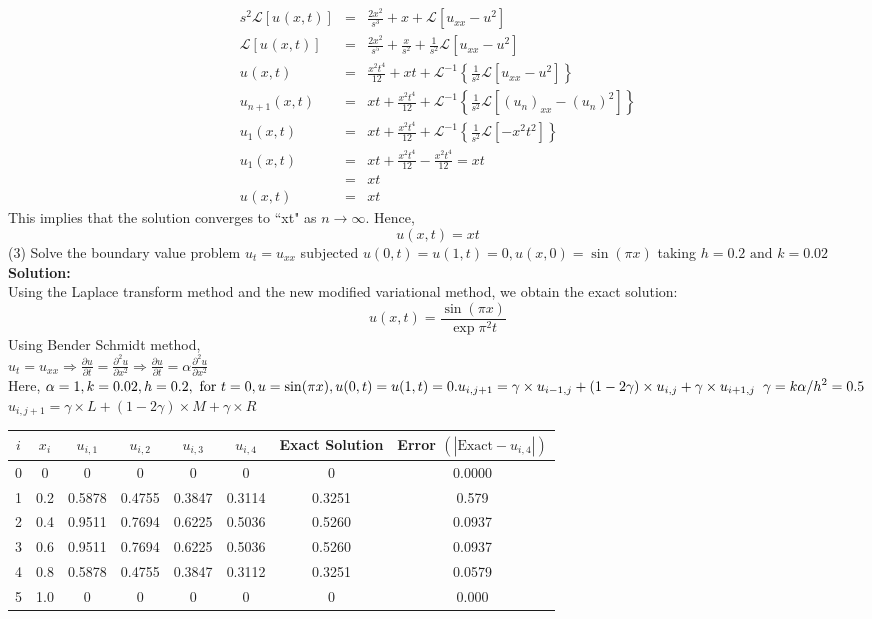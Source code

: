 \documentclass[12pt]{report}
\newcommand{\Laplace}{\mathcal{L}}
\newcommand{\Un}[2]{u_{#1}(#2)}
\newcommand{\LT}[1]{\Laplace \left[#1\right]}
\newcommand{\Unx}[1]{\Un{#1}{x,t}}
\newcommand{\InverseLx}[1]{\Laplace^{-1}\left\{ #1 \right\}}
\newcommand{\Usub}[1]{u_{#1}}
\newcommand{\Usup}[1]{u^{#1}}
\begin{document}
\begin{eqnarray*}
s^2 \LT{\Un{}{x,t}} &=& \frac{2x^2}{s^3} + x + \LT{\Usub{xx} - \Usup{2}} \\
\LT{\Un{}{x,t}} &=& \frac{2x^2}{s^5} + \frac{x}{s^2} + \frac{1}{s^2}\LT{\Usub{xx} - \Usup{2}} \\
\Un{}{x,t} &=& \frac{x^2t^4}{12} + xt + \InverseLx{\frac{1}{s^2}\LT{\Usub{xx} - \Usup{2}}} \\
\Unx{n+1} &=& xt + \frac{x^2t^4}{12} + \InverseLx{\frac{1}{s^2}\LT{(\Usub{n})_{xx} - (\Usub{n})^2}} \\
\Unx{1} &=& xt + \frac{x^2t^4}{12} + \InverseLx{\frac{1}{s^2}\LT{-x^2t^2}} \\
\Unx{1} &=& xt + \frac{x^2t^4}{12} - \frac{x^2t^4}{12} = xt \\
&=& xt \\
\Un{}{x,t} &=& xt
\end{eqnarray*}
This implies that the solution converges to “xt" as $n\rightarrow \infty$. Hence,
$$
	u(x,t) = xt
$$
(3) Solve the boundary value problem $\displaystyle u_t = u_{xx}$ subjected $\displaystyle u(0,t)= u(1,t)=0, u(x,0) = \sin(\pi x)$ taking $\displaystyle h=0.2 \text{ and } k=0.02$\\[0.4cm]
\textbf{Solution:}\\
Using the Laplace transform method and the new modified variational method, we obtain the exact solution:\\
\begin{equation}
	u(x,t) = \frac{\sin(\pi x)}{\exp\pi^2t}
\label{eq:}
\end{equation}
Using Bender Schmidt method,\\[0.2cm]
$\displaystyle u_t = u_{xx} \Rightarrow \frac{\partial u}{\partial t} = \frac{\partial^2 u}{\partial x^2} \Rightarrow \frac{\partial u}{\partial t} = \alpha \frac{\partial^2 u}{\partial x^2}$\\[0.3cm]
Here, $\displaystyle \alpha = 1, k = 0.02, h = 0.2, \text{ for } t = 0, u = \sin(\pi x), u(0,t) = u(1,t) = 0. \\
u_{i,j+1} = \gamma \times u_{i-1,j} + (1-2\gamma) \times u_{i,j} + \gamma \times u_{i+1,j} \; \; \gamma = k\alpha/h^2 = 0.5$\\[0.1cm]
$\displaystyle u_{i,j+1} = \gamma \times L + (1-2\gamma)\times M + \gamma \times R$\\[0.6cm]
\begin{tabular}{c|c|c|c|c|c|c|c}
$i$ & $x_i$ & $u_{i,1}$ & $u_{i,2}$ & $u_{i,3}$ & $u_{i,4}$ & Exact Solution & Error $(\left| \text{Exact} - u_{i,4} \right|)$\\ \hline
0 & 0 & 0 & 0 & 0 & 0 & 0 & 0.0000 \\ \hline
1 & 0.2 & 0.5878 & 0.4755 & 0.3847 & 0.3114 & 0.3251 & 0.579 \\ \hline
2 & 0.4 & 0.9511 & 0.7694 & 0.6225 & 0.5036 & 0.5260 & 0.0937 \\ \hline
3 & 0.6 & 0.9511 & 0.7694 & 0.6225 & 0.5036 & 0.5260 & 0.0937 \\ \hline
4 & 0.8 & 0.5878 & 0.4755 & 0.3847 & 0.3112 & 0.3251 & 0.0579 \\ \hline
5 & 1.0 & 0	& 0 & 0 & 0 & 0 & 0.000 \\
\end{tabular}
\end{document}
